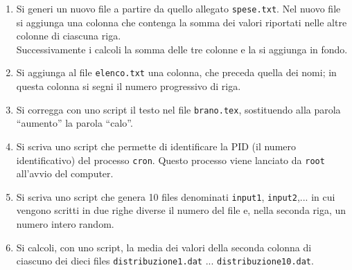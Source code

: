 \documentclass[12pt,italian]{article}
\begin{document}
\begin{enumerate}
\item
Si generi un nuovo file a partire da quello allegato {\tt spese.txt}.
Nel nuovo file si aggiunga una colonna che contenga la somma dei valori riportati 
nelle altre colonne di ciascuna riga.\\
Successivamente i calcoli la somma delle tre colonne e la si aggiunga in fondo.

\item
Si aggiunga al file {\tt elenco.txt} una colonna, 
che preceda quella dei nomi;
in questa colonna si segni il numero progressivo di riga.

\item
Si corregga con uno script il testo nel file {\tt brano.tex},
sostituendo alla parola ``aumento'' la parola ``calo''.

\item
Si scriva uno script che permette di identificare la PID (il numero
identificativo) del processo {\tt cron}. Questo processo viene
lanciato da {\tt root} all'avvio del computer.


\item
Si scriva uno script che 
genera 10 files denominati {\tt input1}, {\tt input2},...
in cui vengono scritti in due righe diverse
il numero del file e, nella seconda riga, un numero intero random.

\item
Si calcoli, con uno script, la media dei valori della seconda colonna di ciascuno dei dieci files
{\tt distribuzione1.dat} ... {\tt distribuzione10.dat}.



\end{enumerate}
\end{document}
